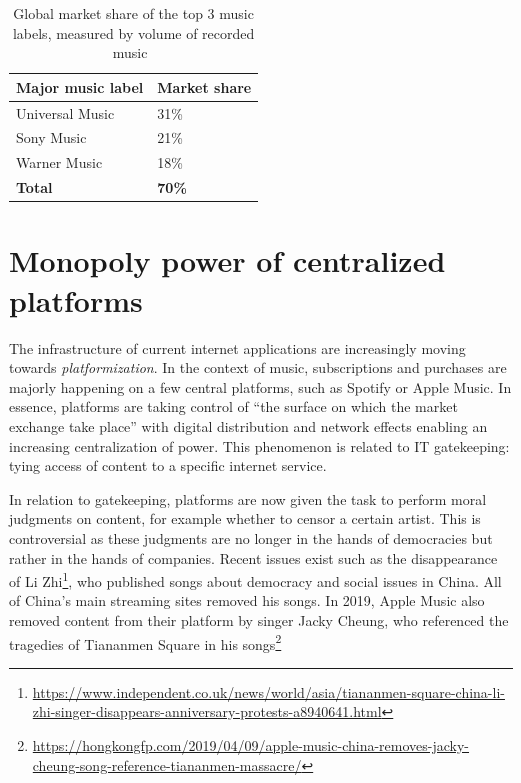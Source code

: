 \begin{table}[]
\centering
\begin{tabular}{|l|l|}
\hline
\textbf{Major music label} & \textbf{Market share} \\ \hline
Universal Music                    & 31\%                  \\ \hline
Sony Music                & 21\%                  \\ \hline
Warner Music               & 18\%                  \\ \hline
\textbf{Total}             & \textbf{70\%}         \\ \hline
\end{tabular}
\caption{Global market share of the top 3 music labels, measured by volume of recorded music~\citep{midiamarketshare2020}}
\label{tab:music-labels-market-share}
\end{table}

\section{Monopoly power of centralized platforms}
The infrastructure of current internet applications are increasingly moving towards \textit{platformization}. In the context of music, subscriptions and purchases are majorly happening on a few central platforms, such as Spotify or Apple Music. In essence, platforms are taking control of ``the surface on which the market exchange take place'' \citep{andersson2016mastering} with digital distribution and network effects enabling an increasing centralization of power. This phenomenon is related to IT gatekeeping: tying access of content to a specific internet service.

\label{sec:problem-description-censoring}
In relation to gatekeeping, platforms are now given the task to perform moral judgments on content, for example whether to censor a certain artist. This is controversial as these judgments are no longer in the hands of democracies but rather in the hands of companies. Recent issues exist such as the disappearance of Li Zhi\footnote{\url{https://www.independent.co.uk/news/world/asia/tiananmen-square-china-li-zhi-singer-disappears-anniversary-protests-a8940641.html}}, who published songs about democracy and social issues in China. All of China's main streaming sites removed his songs. In 2019, Apple Music also removed content from their platform by singer Jacky Cheung, who referenced the tragedies of Tiananmen Square in his songs\footnote{\url{https://hongkongfp.com/2019/04/09/apple-music-china-removes-jacky-cheung-song-reference-tiananmen-massacre/}}

